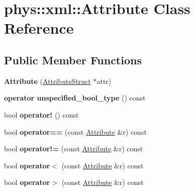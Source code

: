 \hypertarget{classphys_1_1xml_1_1Attribute}{
\section{phys::xml::Attribute Class Reference}
\label{da/ddf/classphys_1_1xml_1_1Attribute}
}
\subsection*{Public Member Functions}
\begin{DoxyCompactItemize}
\item 
\hypertarget{classphys_1_1xml_1_1Attribute_a6786df9d66c675c5a55761a7d3d512a5}{
{\bfseries Attribute} (\hyperlink{structphys_1_1xml_1_1AttributeStruct}{AttributeStruct} $\ast$attr)}
\label{da/ddf/classphys_1_1xml_1_1Attribute_a6786df9d66c675c5a55761a7d3d512a5}

\item 
\hypertarget{classphys_1_1xml_1_1Attribute_ab2cf442667b8ad1b443f0512ccaedcf9}{
{\bfseries operator unspecified\_\-bool\_\-type} () const }
\label{da/ddf/classphys_1_1xml_1_1Attribute_ab2cf442667b8ad1b443f0512ccaedcf9}

\item 
\hypertarget{classphys_1_1xml_1_1Attribute_afa0b14b5409097f426ced7f2b353f1b8}{
bool {\bfseries operator!} () const }
\label{da/ddf/classphys_1_1xml_1_1Attribute_afa0b14b5409097f426ced7f2b353f1b8}

\item 
\hypertarget{classphys_1_1xml_1_1Attribute_aec8429cea23995f2961bb940b5350792}{
bool {\bfseries operator==} (const \hyperlink{classphys_1_1xml_1_1Attribute}{Attribute} \&r) const }
\label{da/ddf/classphys_1_1xml_1_1Attribute_aec8429cea23995f2961bb940b5350792}

\item 
\hypertarget{classphys_1_1xml_1_1Attribute_a8728dccdafb4da771ce55968154e5a2d}{
bool {\bfseries operator!=} (const \hyperlink{classphys_1_1xml_1_1Attribute}{Attribute} \&r) const }
\label{da/ddf/classphys_1_1xml_1_1Attribute_a8728dccdafb4da771ce55968154e5a2d}

\item 
\hypertarget{classphys_1_1xml_1_1Attribute_a25225938f6b74f0c0aec696ee4c925c6}{
bool {\bfseries operator$<$} (const \hyperlink{classphys_1_1xml_1_1Attribute}{Attribute} \&r) const }
\label{da/ddf/classphys_1_1xml_1_1Attribute_a25225938f6b74f0c0aec696ee4c925c6}

\item 
\hypertarget{classphys_1_1xml_1_1Attribute_ae4761c43b4dbd3bdcf99b172aff6ca8e}{
bool {\bfseries operator$>$} (const \hyperlink{classphys_1_1xml_1_1Attribute}{Attribute} \&r) const }
\label{da/ddf/classphys_1_1xml_1_1Attribute_ae4761c43b4dbd3bdcf99b172aff6ca8e}


\end{DoxyCompactItemize}
